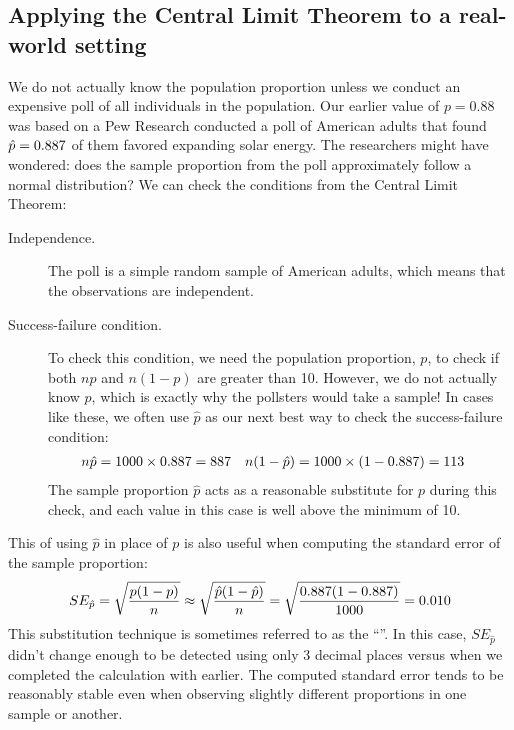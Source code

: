 \subsection{Applying the Central Limit Theorem to
    a real-world setting}
\label{apply_clt_real_world_setting}

We do not actually know the population proportion
unless we conduct an expensive poll of all individuals
in the population.
Our earlier value of $p = 0.88$ was based on
a Pew Research conducted a poll of \pewsolarpollsize{}
American adults that found
$\hat{p} = 0.887{}$ of them favored
expanding solar energy.
The researchers might have wondered:
does the sample proportion from the poll approximately
follow a normal distribution?
We can check the conditions from the Central Limit Theorem:
\begin{description}
\item[Independence.] The poll is a simple random sample of
    American adults, which means that the observations are
    independent.
\item[Success-failure condition.] To check this condition,
    we need the population proportion, $p$, to check if both
    $np$ and $n(1-p)$ are greater than 10.
    However, we do not actually know $p$, which
    is exactly why the pollsters would take a sample!
    In cases like these, we often use $\hat{p}$
    as our next best way to check the success-failure condition:
    \begin{align*}
    n\hat{p}
        &= 1000{} \times 0.887{}
        = 887{}
    &n (1 - \hat{p})
        &= 1000{} \times (1 - 0.887{})
        = 113{}
    \end{align*}
    The sample proportion $\hat{p}$ acts as
    a reasonable substitute for $p$ during this check,
    and each value in this case is well above the minimum of 10.
\end{description}

This  of using $\hat{p}$ in
place of $p$ is also useful when computing the standard error
of the sample proportion:
\begin{align*}
SE_{\hat{p}}
    = \sqrt{\frac{p (1 - p)}{n}}
    \approx \sqrt{\frac{\hat{p} (1 - \hat{p})}{n}}
    = \sqrt{\frac{0.887{}
        (1 - 0.887{})}{1000{}}}
    = 0.010{}
\end{align*}
This substitution technique is sometimes
referred to as the ``''.
In this case, $SE_{\hat{p}}$ didn't change enough to
be detected using only 3 decimal places
versus when we completed the calculation with
\pewsolarparprop{} earlier.
The computed standard error tends to be reasonably stable
even when observing slightly different proportions in one
sample or another.


